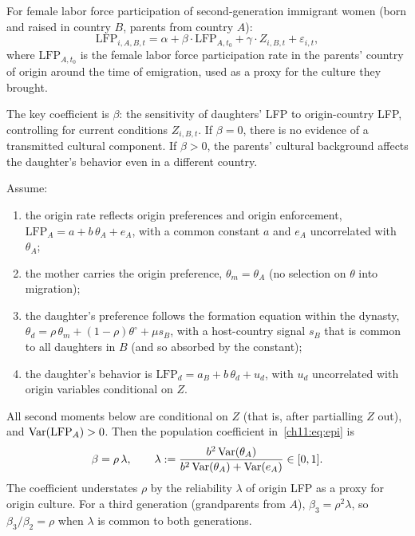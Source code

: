 \documentclass[../structural_economics_book.tex]{subfiles}
\begin{document}
\begin{definition}\label{ch11:def:epi}
For female labor force participation of second-generation immigrant women (born and raised in country $B$, parents from country $A$):
\begin{equation}\label{ch11:eq:epi}
\text{LFP}_{i,A,B,t} = \alpha + \beta \cdot \text{LFP}_{A,t_0} + \gamma \cdot Z_{i,B,t} + \varepsilon_{i,t},
\end{equation}
where $\text{LFP}_{A,t_0}$ is the female labor force participation rate in the parents' country of origin around the time of emigration, used as a proxy for the culture they brought.
\end{definition}

The key coefficient is $\beta$: the sensitivity of daughters' LFP to origin-country LFP, controlling for current conditions $Z_{i,B,t}$. If $\beta = 0$, there is no evidence of a transmitted cultural component. If $\beta > 0$, the parents' cultural background affects the daughter's behavior even in a different country.

\begin{proposition}\label{ch11:thm:epi_id}
Assume:
\begin{enumerate}
\item the origin rate reflects origin preferences and origin enforcement, $\text{LFP}_A = a + b\,\theta_A + e_A$, with a common constant $a$ and $e_A$ uncorrelated with $\theta_A$;
\item the mother carries the origin preference, $\theta_m = \theta_A$ (no selection on $\theta$ into migration);
\item the daughter's preference follows the formation equation within the dynasty, $\theta_d = \rho\,\theta_m + (1-\rho)\theta^{\circ} + \mu s_B$, with a host-country signal $s_B$ that is common to all daughters in $B$ (and so absorbed by the constant);
\item the daughter's behavior is $\text{LFP}_d = a_B + b\,\theta_d + u_d$, with $u_d$ uncorrelated with origin variables conditional on $Z$.
\end{enumerate}
All second moments below are conditional on $Z$ (that is, after partialling $Z$ out), and $\operatorname{Var}(\text{LFP}_A) > 0$.
Then the population coefficient in~\eqref{ch11:eq:epi} is
\begin{equation}\label{ch11:eq:epi_beta}
\beta = \rho\,\lambda, \qquad \lambda := \frac{b^2\operatorname{Var}(\theta_A)}{b^2\operatorname{Var}(\theta_A) + \operatorname{Var}(e_A)} \in [0, 1].
\end{equation}
The coefficient understates $\rho$ by the reliability $\lambda$ of origin LFP as a proxy for origin culture. For a third generation (grandparents from $A$), $\beta_3 = \rho^2\lambda$, so $\beta_3/\beta_2 = \rho$ when $\lambda$ is common to both generations.
\end{proposition}
\end{document}
